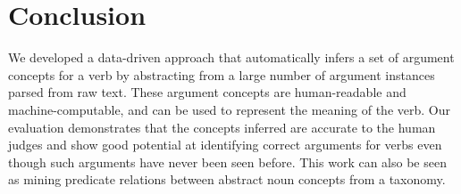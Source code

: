 \section{Conclusion}
\label{sec:conclude}
We developed a data-driven approach that automatically
infers a set of argument concepts for a verb by abstracting from a large
number of argument instances parsed from raw text.
These argument concepts are human-readable and machine-computable,
and can be used to represent the meaning of the verb.
Our evaluation demonstrates that the concepts inferred are
accurate to the human judges and show good potential at
identifying correct arguments for verbs even though such
arguments have never been seen before. This work can also
be seen as mining predicate relations between abstract noun
concepts from a taxonomy.
